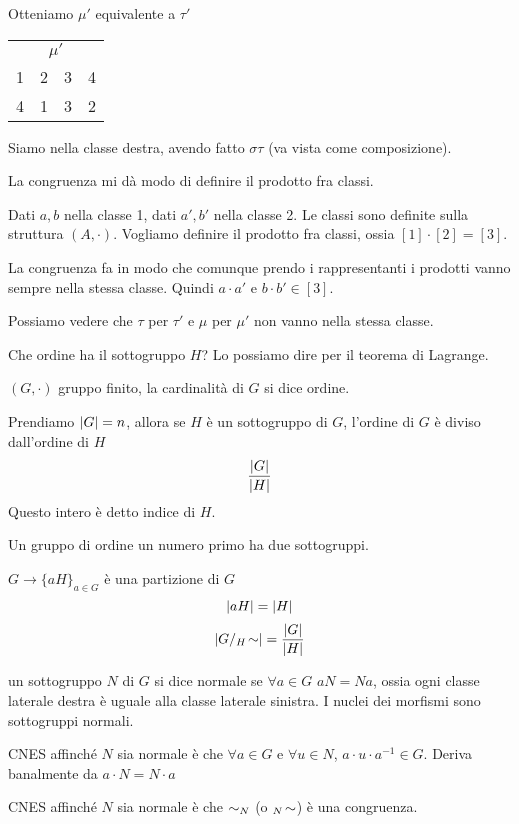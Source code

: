 Otteniamo $\mu'$ equivalente a $\tau'$

\begin{tabular}{cccc}
\multicolumn{4}{c}{$\mu'$} \\
1 & 2 & 3 & 4 \\
4 & 1 & 3 & 2
\end{tabular}


Siamo nella classe destra, avendo fatto $\sigma \tau$ (va vista come composizione).

La congruenza mi d\`a modo di definire il prodotto fra classi. 

Dati $a, b$ nella classe 1, dati $a', b'$ nella classe 2. Le classi sono definite sulla struttura $(A, \cdot)$. Vogliamo definire il prodotto fra classi, ossia $[1] \cdot [2] = [3]$. 

La congruenza fa in modo che comunque prendo i rappresentanti i prodotti vanno sempre nella stessa classe. Quindi $a \cdot a'$ e $b \cdot b' \in [3]$.

Possiamo vedere che $\tau$ per $\tau'$ e $\mu$ per $\mu'$ non vanno nella stessa classe.

Che ordine ha il sottogruppo $H$? Lo possiamo dire per il teorema di Lagrange.

\begin{theorem}
$(G, \cdot)$ gruppo finito, la cardinalit\`a di $G$ si dice ordine.

Prendiamo $\left\lvert{G}\right\rvert = n$, allora se $H$ \`e un sottogruppo di $G$, l'ordine di $G$ \`e diviso dall'ordine di $H$
\[
\frac{\left\lvert{G}\right\rvert}{\left\lvert{H}\right\rvert}
\]
Questo intero \`e detto indice di $H$.
\end{theorem}

Un gruppo di ordine un numero primo ha due sottogruppi.

$G \to \{ a H\}_{a \in G}$
\`e una partizione di $G$
\[
\left\lvert{a H}\right\rvert = \left\lvert{H}\right\rvert
\]
\[
\left\lvert{G / {}_{H}\!\sim}\right\rvert = \frac{\left\lvert{G}\right\rvert}{\left\lvert{H}\right\rvert}
\]
\begin{defn}
un sottogruppo $N$ di $G$ si dice normale se $\forall a \in G$ $a N = N a$, ossia ogni classe laterale destra \`e uguale alla classe laterale sinistra. I nuclei dei morfismi sono sottogruppi normali.
\end{defn}
CNES affinch\'e $N$ sia normale \`e che $\forall a \in G$ e $\forall u \in N$, $a \cdot u \cdot a^{-1} \in G$. Deriva banalmente da $a \cdot N = N \cdot a$

CNES affinch\'e $N$ sia normale \`e che $\sim_{N}$ (o ${}_{N}\!\sim$) \`e una congruenza.

